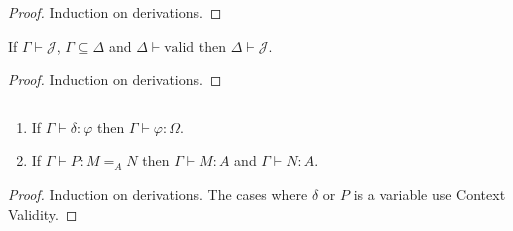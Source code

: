 \documentclass[a4paper,UKenglish]{lipics-v2016}
\newcommand*{\vald}{\ensuremath{\vdash \mathrm{valid}}}
\theoremstyle{plain}
\theoremstyle{definition}
\begin{document}
\begin{proof}
Induction on derivations.
\end{proof}

\begin{lemma}[Weakening]
If $\Gamma \vdash \mathcal{J}$, $\Gamma \subseteq \Delta$ and $\Delta \vald$ then $\Delta \vdash \mathcal{J}$.
\end{lemma}

\begin{proof}
Induction on derivations.
\end{proof}

\begin{lemma}
$ $
\begin{enumerate}
\item
If $\Gamma \vdash \delta : \varphi$ then $\Gamma \vdash \varphi : \Omega$.
\item
If $\Gamma \vdash P : M =_A N$ then $\Gamma \vdash M : A$ and $\Gamma \vdash N : A$.
\end{enumerate}
\end{lemma}

\begin{proof}
Induction on derivations.  The cases where $\delta$ or $P$ is a variable use Context Validity.
\end{proof}
\end{document}
